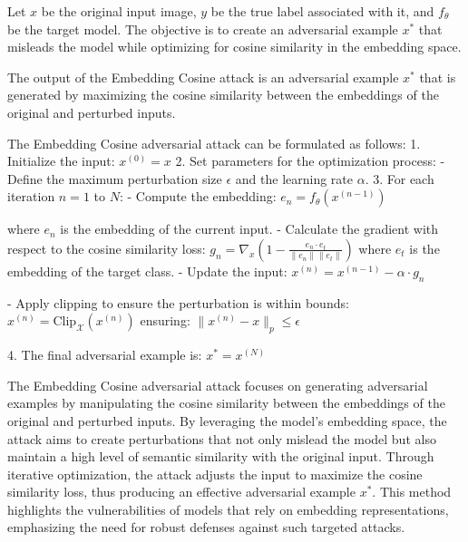 Let $x$ be the original input image, $y$ be the true label associated with it, and $f_{\theta}$ be the target model. The objective is to create an adversarial example $x^*$ that misleads the model while optimizing for cosine similarity in the embedding space.

The output of the Embedding Cosine attack is an adversarial example $x^*$ that is generated by maximizing the cosine similarity between the embeddings of the original and perturbed inputs.

The Embedding Cosine adversarial attack can be formulated as follows:
1. Initialize the input:
   $x^{(0)} = x$
2. Set parameters for the optimization process:
   - Define the maximum perturbation size $\epsilon$ and the learning rate $\alpha$.
3. For each iteration $n = 1$ to $N$:
   - Compute the embedding:
   $e_n = f_{\theta}(x^{(n-1)})$
   
   where $e_n$ is the embedding of the current input.
   - Calculate the gradient with respect to the cosine similarity loss:
   $g_n = \nabla_x \left(1 - \frac{e_n \cdot e_t}{\|e_n\| \|e_t\|}\right)$
   where $e_t$ is the embedding of the target class.
   - Update the input:
   $x^{(n)} = x^{(n-1)} - \alpha \cdot g_n$
   
   - Apply clipping to ensure the perturbation is within bounds:
   $x^{(n)} = \text{Clip}_{\mathcal{X}}(x^{(n)})$
   ensuring:
   $\|x^{(n)} - x\|_p \leq \epsilon$

4. The final adversarial example is:
   $x^* = x^{(N)}$

The Embedding Cosine adversarial attack focuses on generating adversarial examples by manipulating the cosine similarity between the embeddings of the original and perturbed inputs. By leveraging the model's embedding space, the attack aims to create perturbations that not only mislead the model but also maintain a high level of semantic similarity with the original input. Through iterative optimization, the attack adjusts the input to maximize the cosine similarity loss, thus producing an effective adversarial example $x^*$. This method highlights the vulnerabilities of models that rely on embedding representations, emphasizing the need for robust defenses against such targeted attacks.
